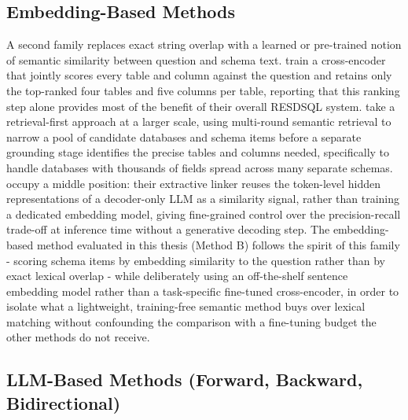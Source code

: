 \subsection{Embedding-Based Methods}\label{sec:2-3-2}

A second family replaces exact string overlap with a learned or pre-trained notion of semantic similarity between question and schema text. \citet{li2023} train a cross-encoder that jointly scores every table and column against the question and retains only the top-ranked four tables and five columns per table, reporting that this ranking step alone provides most of the benefit of their overall RESDSQL system. \citet{wang2025} take a retrieval-first approach at a larger scale, using multi-round semantic retrieval to narrow a pool of candidate databases and schema items before a separate grounding stage identifies the precise tables and columns needed, specifically to handle databases with thousands of fields spread across many separate schemas. \citet{glass2025} occupy a middle position: their extractive linker reuses the token-level hidden representations of a decoder-only LLM as a similarity signal, rather than training a dedicated embedding model, giving fine-grained control over the precision-recall trade-off at inference time without a generative decoding step. The embedding-based method evaluated in this thesis (Method B) follows the spirit of this family - scoring schema items by embedding similarity to the question rather than by exact lexical overlap - while deliberately using an off-the-shelf sentence embedding model rather than a task-specific fine-tuned cross-encoder, in order to isolate what a lightweight, training-free semantic method buys over lexical matching without confounding the comparison with a fine-tuning budget the other methods do not receive.

\subsection{LLM-Based Methods (Forward, Backward, Bidirectional)}\label{sec:2-3-3}

